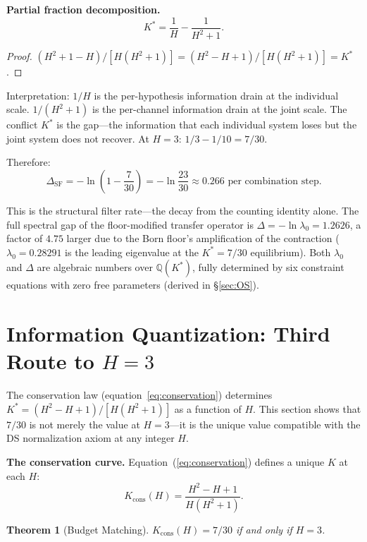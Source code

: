 \documentclass[11pt,a4paper]{article}
\newtheorem{theorem}{Theorem}[section]
\theoremstyle{definition}
\theoremstyle{remark}
\begin{document}
\textbf{Partial fraction decomposition.}
\begin{equation}\label{eq:partial}
K^*=\frac{1}{H}-\frac{1}{H^2+1}.
\end{equation}

\begin{proof}
$(H^2+1-H)/[H(H^2+1)]=(H^2-H+1)/[H(H^2+1)]=K^*$.
\end{proof}

Interpretation: $1/H$ is the per-hypothesis information drain at the individual scale. $1/(H^2+1)$ is the per-channel information drain at the joint scale. The conflict $K^*$ is the gap---the information that each individual system loses but the joint system does not recover. At $H=3$: $1/3-1/10=7/30$.

Therefore:
\begin{equation}\label{eq:Delta}
\Delta_{\mathrm{SF}}=-\ln\!\left(1-\frac{7}{30}\right)=-\ln\frac{23}{30}\approx 0.266\text{ per combination step.}
\end{equation}

This is the structural filter rate---the decay from the counting identity alone. The full spectral gap of the floor-modified transfer operator is $\Delta=-\ln\lambda_0=1.2626$, a factor of $4.75$ larger due to the Born floor's amplification of the contraction ($\lambda_0=0.28291$ is the leading eigenvalue at the $K^*=7/30$ equilibrium). Both $\lambda_0$ and $\Delta$ are algebraic numbers over $\mathbb{Q}(K^*)$, fully determined by six constraint equations with zero free parameters (derived in \S\ref{sec:OS}).


\section{Information Quantization: Third Route to $H=3$}\label{sec:quantization}

The conservation law (equation~\ref{eq:conservation}) determines $K^*=(H^2-H+1)/[H(H^2+1)]$ as a function of $H$. This section shows that $7/30$ is not merely the value at $H=3$---it is the unique value compatible with the DS normalization axiom at any integer $H$.

\textbf{The conservation curve.} Equation~(\ref{eq:conservation}) defines a unique $K$ at each $H$:
\begin{equation}\label{eq:Kcons}
K_{\mathrm{cons}}(H)=\frac{H^2-H+1}{H(H^2+1)}.
\end{equation}

\begin{theorem}[Budget Matching]\label{thm:budget}
$K_{\mathrm{cons}}(H)=7/30$ if and only if $H=3$.
\end{theorem}
\end{document}
